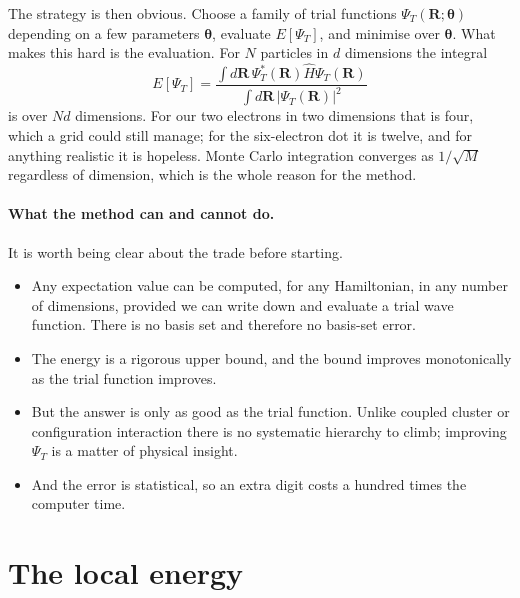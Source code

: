 The strategy is then obvious.  Choose a family of trial functions
$\Psi_T(\bm{R};\bm{\theta})$ depending on a few parameters $\bm{\theta}$,
evaluate $E[\Psi_T]$, and minimise over $\bm{\theta}$.  What makes this hard
is the evaluation.  For $N$ particles in $d$ dimensions the integral
\begin{equation}
  E[\Psi_T]
   = \frac{\int d\bm{R}\,\Psi_T^{*}(\bm{R})\hat{H}\Psi_T(\bm{R})}
          {\int d\bm{R}\,|\Psi_T(\bm{R})|^2}
  \label{eq:13-energyintegral}
\end{equation}
is over $Nd$ dimensions.  For our two electrons in two dimensions that is
four, which a grid could still manage; for the six-electron dot it is twelve,
and for anything realistic it is hopeless.  Monte Carlo integration converges
as $1/\sqrt{M}$ regardless of dimension, which is the whole reason for the
method.

\paragraph{What the method can and cannot do.}
It is worth being clear about the trade before starting.

\begin{svgraybox}
\begin{itemize}
\item Any expectation value can be computed, for any Hamiltonian, in any
  number of dimensions, provided we can write down and evaluate a trial wave
  function.  There is no basis set and therefore no basis-set error.
\item The energy is a rigorous upper bound, and the bound improves
  monotonically as the trial function improves.
\item But the answer is only as good as the trial function.  Unlike coupled
  cluster or configuration interaction there is no systematic hierarchy to
  climb; improving $\Psi_T$ is a matter of physical insight.
\item And the error is statistical, so an extra digit costs a hundred times
  the computer time.
\end{itemize}
\end{svgraybox}

\section{The local energy}
\label{sec:vmclocalenergy}


